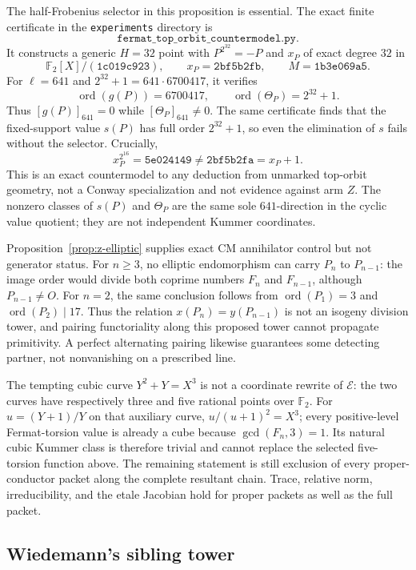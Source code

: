\documentclass[11pt]{article}
\theoremstyle{definition}
\theoremstyle{remark}
\begin{document}
The half-Frobenius selector in this proposition is essential.  The exact
finite certificate in the \texttt{experiments} directory is
\[
 \texttt{fermat\_top\_orbit\_countermodel.py}.
\]
It constructs a generic
$H=32$ point with $P^{2^{32}}=-P$ and $x_P$ of exact degree $32$ in
\[
 \mathbb F_2[X]/(\mathtt{1c019c923}),\qquad
 x_P=\mathtt{2bf5b2fb},\qquad
 M=\mathtt{1b3e069a5}.
\]
For $\ell=641$ and $2^{32}+1=641\cdot6700417$, it verifies
\[
 \operatorname{ord}(g(P))=6700417,
 \qquad \operatorname{ord}(\Theta_P)=2^{32}+1.
\]
Thus $[g(P)]_{641}=0$ while $[\Theta_P]_{641}\ne0$.  The same certificate
finds that the fixed-support value $s(P)$ has full order $2^{32}+1$, so even
the elimination of $s$ fails without the selector.  Crucially,
\[
 x_P^{2^{16}}=\mathtt{5e024149}\ne
 \mathtt{2bf5b2fa}=x_P+1.
\]
This is an exact countermodel to any deduction from unmarked top-orbit
geometry, not a Conway specialization and not evidence against arm $Z$.
The nonzero classes of $s(P)$ and $\Theta_P$ are the same sole
$641$-direction in the cyclic value quotient; they are not independent
Kummer coordinates.

Proposition~\ref{prop:z-elliptic} supplies exact CM annihilator control but
not generator status.  For $n\geq3$, no elliptic endomorphism can carry $P_n$ to
$P_{n-1}$: the image order would divide both coprime numbers $F_n$ and
$F_{n-1}$, although $P_{n-1}\ne O$.  For $n=2$, the same conclusion follows
from $\operatorname{ord}(P_1)=3$ and $\operatorname{ord}(P_2)\mid17$.
Thus the relation
$x(P_n)=y(P_{n-1})$ is not an isogeny division tower, and pairing functoriality
along this proposed tower cannot propagate primitivity.  A perfect alternating
pairing likewise guarantees some detecting partner, not nonvanishing on a
prescribed line.

The tempting cubic curve $Y^2+Y=X^3$ is not a coordinate rewrite of
$\mathcal E$: the two curves have respectively three and five rational points
over $\mathbb F_2$.  For $u=(Y+1)/Y$ on that auxiliary curve,
$u/(u+1)^2=X^3$; every positive-level Fermat-torsion value is already a cube
because $\gcd(F_n,3)=1$.  Its natural cubic Kummer class is therefore trivial
and cannot replace the selected five-torsion function above.  The remaining
statement is still exclusion of every proper-conductor packet along the
complete resultant chain.  Trace, relative norm, irreducibility, and the
etale Jacobian hold for proper packets as well as the full packet.

\subsection{Wiedemann's sibling tower}\label{sec:z-wiedemann}
\end{document}
